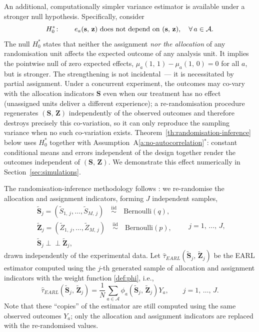 \documentclass[sigconf]{acmart}
\newcommand{\iidsim}{{\stackrel{\mathrm{iid}}{\sim}}}
\newcommand{\ind}{\perp\!\!\!\perp}
\begin{document}
An additional, computationally simpler variance estimator is available under a stronger null hypothesis. Specifically, consider
\begin{equation}\label{def:strong-null}
    H_0^*\colon\qquad e_a(\mathbf s,\,\mathbf z)\ \textup{does not depend on }(\mathbf s,\,\mathbf z),\quad \forall\,a\in\mathcal A.
\end{equation}
The null $H_0^*$ states that neither the assignment \emph{nor the allocation} of any randomisation unit affects the expected outcome of any analysis unit. It implies the pointwise null of zero expected effects, $\mu_a(1,\,1)-\mu_a(1,\,0)=0$ for all $a$, but is stronger. The strengthening is not incidental~--- it is necessitated by partial assignment. Under a concurrent experiment, the outcomes may co-vary with the allocation indicators $\mathbf S$ even when our treatment has no effect (unassigned units deliver a different experience); a re-randomisation procedure regenerates $(\mathbf S,\,\mathbf Z)$ independently of the observed outcomes and therefore destroys precisely this co-variation, so it can only reproduce the sampling variance when no such co-variation exists. Theorem~\ref{th:randomisation-inference} below uses $H_0^*$ together with Assumption~A\ref{a:no-autocorrelation}$^*$: constant conditional means and errors independent of the design together render the outcomes independent of $(\mathbf S,\,\mathbf Z)$. We demonstrate this effect numerically in Section~\ref{sec:simulations}.

The randomisation-inference methodology follows \cite[Section~4]{shi2025scalableanalysisbipartiteexperiments}: we re-randomise the allocation and assignment indicators, forming $J$ independent samples,
\begin{equation}\label{def:S-Z-samples}
    \begin{array}{c}
        \tilde{\mathbf{S}}_j = (\tilde S_{1,\,j},\ldots,\tilde S_{M,\,j}) \quad \iidsim \quad \mathrm{Bernoulli}(q),\\
        \tilde{\mathbf Z}_j = (\tilde Z_{1,\,j},\ldots,\tilde Z_{M,\,j}) \quad \iidsim \quad \mathrm{Bernoulli}(p),\\
        \tilde{\mathbf{S}}_j\ind \tilde{\mathbf Z}_j,
    \end{array}\qquad j=1,\,\ldots,\,J,
\end{equation}
drawn independently of the experimental data. Let $\hat\tau^{\phantom{1}}_{EARL}(\tilde {\mathbf S}_j,\,\tilde{\mathbf Z}_j)$ be the EARL estimator computed using the $j$-th generated sample of allocation and assignment indicators with the weight function \eqref{def:phi}, i.e.,
$$
    \hat\tau^{\phantom{1}}_{EARL}(\tilde {\mathbf S}_j,\,\tilde{\mathbf Z}_j) = \frac 1 N \sum_{a\in\mathcal{A}}\phi_a(\tilde {\mathbf S}_j,\,\tilde{\mathbf Z}_j)Y_a,\qquad j=1,\,\ldots,\,J.
$$
Note that these ``copies'' of the estimator are still computed using the same observed outcomes $Y_a$; only the allocation and assignment indicators are replaced with the re-randomised values.
\end{document}
